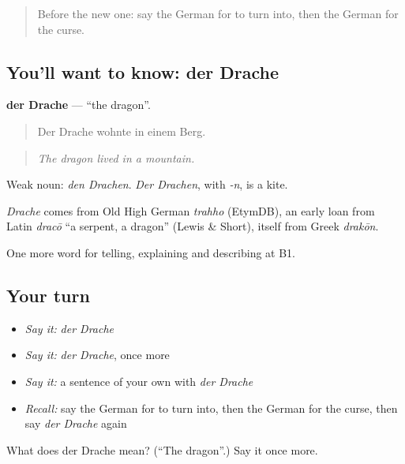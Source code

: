 \label{lesson:GE-C314-drache}



\begin{quote}
Before the new one: say the German for to turn into, then the German for the curse.
\end{quote}

\subsection*{You'll want to know: der Drache}
\textbf{der Drache} — \textquotedblleft{}the dragon\textquotedblright{}.

\begin{quote}
Der Drache wohnte in einem Berg.
\end{quote}

\begin{quote}
\emph{The dragon lived in a mountain.}
\end{quote}

Weak noun: \emph{den Drachen}. \emph{Der Drachen}, with \emph{-n}, is a kite.

\begin{cousinweb}
\emph{Drache} comes from Old High German \emph{trahho} (EtymDB), an early loan from Latin \emph{dracō} \textquotedblleft{}a serpent, a dragon\textquotedblright{} (Lewis \& Short), itself from Greek \emph{drakōn}.
\end{cousinweb}

\begin{grammarlens}[title={What you've built}]
One more word for telling, explaining and describing at B1.
\end{grammarlens}

\subsection*{Your turn}
\begin{itemize}
\raggedright
  \item \emph{Say it:} \emph{der Drache}
  \item \emph{Say it:} \emph{der Drache}, once more
  \item \emph{Say it:} a sentence of your own with \emph{der Drache}
  \item \emph{Recall:} say the German for to turn into, then the German for the curse, then say \emph{der Drache} again
\end{itemize}

\begin{tcolorbox}[breakable,colback=teal!4,colframe=teal!35!black,title={Before you move on}]
What does der Drache mean? (\textquotedblleft{}The dragon\textquotedblright{}.) Say it once more.
\end{tcolorbox}
